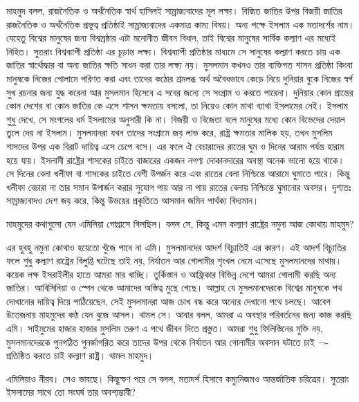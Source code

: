 \documentclass[
]{book}
\begin{document}
মাহমুদ বলল, রাজনৈতিক ও অর্থনৈতিক স্বার্থ হাসিলই সাম্রাজ্যবাদের মূল লক্ষ্য। বিজিত জাতির উপর বিজয়ী জাতির রাজনৈতিক ও অর্থনৈতিক প্রভূত্ব প্রতিষ্ঠাই সাম্রাজ্যবাদের একমাত্র কাম্য বিষয়। অন্য পক্ষে ইসলাম এক মতাদর্শের নাম। যেহেতু বিশ্বের মানুষের জন্য বিশ্বস্রষ্ঠার এটা মনোনীত জীবন বিধান, তাই বিশ্বের মানুষের সার্বিক কল্যাণ এর মধ্যেই নিহিত। সুতরাং বিশ্বব্যাপী প্রতিষ্ঠা এর চূড়ান্ত লক্ষ্য। বিশ্বব্যাপী প্রতিষ্ঠার মাধ্যমে সে সানুষের কল্যাণ করতে চায় এক জাতির স্বার্থোদ্ধার বা অন্য জাতির ক্ষতি সাধন করা তার লক্ষ্য নয়। মুসলমান কখনও তার ব্যক্তিগত শাসন প্রতিষ্ঠা কিংবা মানুষকে নিজের গোলামে পরিণত করা এবং তাদের কঠোর শ্রমলব্ধ অর্থ অবৈধভাবে কেড়ে নিয়ে দুনিয়ার বুকে নিজের স্বর্গ সুখ রচনার জন্য যুদ্ধ করেনা আর মুসলমান হিসেবে এ সবের জন্যে সে সংগ্রাম ও করতে পারেনা। দুনিয়ার কোন প্রান্তের কোন দেশের বা কোন জাতির কে এসে শাসন ক্ষমতায় বসলো, তা নিয়েও কোন মাথা ব্যাথা ইসলামের নেই। ইসলাম শুধু দেখে, সে মংগলের ধর্ম ইসলামের অনুসারী কি না। বিজয়ী ও বিজেতা বলে মানুষের মধ্যে কোন বিভেদের দেয়াল তুলে দেয় না ইসলাম। মুসলমানরা যখন তাদের সংগ্রামে জয় লাভ করে, রাষ্ট্র ক্ষমতার মালিক হয়, তখন মুসলিম শাসদের উপর এক বিরাট দায়িত্ব এসে চেপে বসে। এর ফলে ঐ বেচারাদের রাতের ঘুম ও দিনের আরাম পর্যন্ত হারাম হয়ে যায়। ইসলামী রাষ্ট্রের শাসকের চাইতে বাজারের একজন নগণ্য দোকানদারের অবস্থা অনেক ভালো হয়ে থাকে। সে দিনের বেলা খলীফা বা শাসকের চাইতে বেশী উপর্জন করে এবং রাতের বেলা নিশ্চিন্তে আরামে ঘুমাতে পারে। কিন্তু খলীফা বেচারা না তার সমান উপার্জন করার সুযোগ পায় আর না পায় রাতের বেলায় নিশ্চিন্তে ঘুমানোর অবসর। দৃশ্যতঃ সাম্রাজ্যবাদও দেশ জয় করে, কিন্তু উভয়ের প্রকৃতিতে আসমান জমিন পার্থক্য বিদ্যমান।

মাহমুদের কথাগুলো যেন এমিলিয়া গোগ্রাসে গিলছিল। বলল সে, কিন্তু এমন কল্যাণ রাষ্ট্রের নমুনা আজ কোথায় মাহমুদ?

এর হুবহু নমুনা কোথাও হয়েতো খুঁজে পাবে না এমি। মুসলমানদের আদর্শ বিচ্যুতিই এর কারণ। এই আদর্শ বিচ্যুতির ফলে শুধু কল্যাণ রাষ্ট্রের বিলুপ্তি ঘটেছে তাই নয়, নির্যাতন আর গোলামীর শৃংখল নেমে এসেছে মুসলমানদের মাথায়। কয়েক লক্ষ ইসরাইলীর হাতে আমরা মার খাচ্ছি। তুর্কিস্তান ও আফ্রিকার বিভিন্ন দেশে আমরা গোলামী করছি অন্য জাতির। আবিসিনিয়া ও স্পেন থেকে আমাদের অস্তিত্ব মুছে গেছে। আল্লাহ যে মুসলমানদেরকে বিশ্বের মানুষকে পথ দোখানোর দায়িত্ব দিয়ে পাঠিয়েছেন, সেই মুসলমানরা আজ চোখ বন্ধ করে অন্যের দেখানো পথে চলছে। আবেগ উত্তেজনায় মাহমুদের কণ্ঠ যেন বুজে আসল। থামল সে। আবার বলল, আমরা এ অবস্থার পরিবর্তনের জন্য কাজ করছি এমি। সাইমুমের হাজার হাজার মুসলিম তরুণ এ পথে জীবন দিতে প্রস্তুত। আমরা শুধু ফিলিস্তিনের মুক্তি নয়, মুসলমানদেরকে পুনগঠিত পুনর্জাগরিত করে তাদের উপর থেকে নির্যাতন আর গোলামীর অবসান ঘটাতে চাই ¬- প্রতিষ্ঠিত করতে চাই কল্যাণ রাষ্ট্র। থামল মাহমুদ।

এমিলিয়াও নীরব। সেও ভাবছে। কিছুক্ষণ পরে সে বলল, মতাদর্শ হিসাবে কম্যুনিজমও আন্তর্জাতিক চরিত্রের। সুতরাং ইসলামের সাথে তো সংঘর্ষ তার অবশ্যম্ভাবী?
\end{document}
